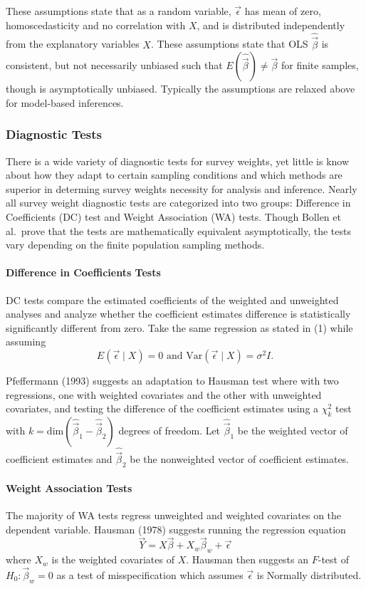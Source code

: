 \documentclass[
  letterpaper,
  DIV=11,
  numbers=noendperiod]{scrartcl}
\let\oldparagraph\paragraph
\renewcommand{\paragraph}[1]{\oldparagraph{#1}\mbox{}}
\begin{document}
These assumptions state that as a random variable, \(\vec{\epsilon}\)
has mean of zero, homoscedasticity and no correlation with \(X\), and is
distributed independently from the explanatory variables \(X\). These
assumptions state that OLS \(\hat{\vec{\beta}}\) is consistent, but not
necessarily unbiased such that \(E(\hat{\vec{\beta}}) \neq \vec{\beta}\)
for finite samples, though is asymptotically unbiased. Typically the
assumptions are relaxed above for model-based inferences.

\hypertarget{diagnostic-tests}{%
\subsubsection{Diagnostic Tests}\label{diagnostic-tests}}

There is a wide variety of diagnostic tests for survey weights, yet
little is know about how they adapt to certain sampling conditions and
which methods are superior in determing survey weights necessity for
analysis and inference. Nearly all survey weight diagnostic tests are
categorized into two groups: Difference in Coefficients (DC) test and
Weight Association (WA) tests. Though Bollen et al.~prove that the tests
are mathematically equivalent asymptotically, the tests vary depending
on the finite population sampling methods.

\hypertarget{difference-in-coefficients-tests}{%
\paragraph{Difference in Coefficients
Tests}\label{difference-in-coefficients-tests}}

DC tests compare the estimated coefficients of the weighted and
unweighted analyses and analyze whether the coefficient estimates
difference is statistically significantly different from zero. Take the
same regression as stated in (1) while assuming
\[E(\vec{\epsilon} \mid X) = 0 \text{ and } \text{Var}(\vec{\epsilon} \mid X) = \sigma^2 I.\]

Pfeffermann (1993) suggests an adaptation to Hausman test where with two
regressions, one with weighted covariates and the other with unweighted
covariates, and testing the difference of the coefficient estimates
using a \(\chi_{k}^2\) test with
\(k = \text{dim}(\hat{\vec{\beta}}_1 - \hat{\vec{\beta}}_2)\) degrees of
freedom. Let \(\hat{\vec{\beta}}_1\) be the weighted vector of
coefficient estimates and \(\hat{\vec{\beta}}_2\) be the nonweighted
vector of coefficient estimates.

\hypertarget{weight-association-tests}{%
\paragraph{Weight Association Tests}\label{weight-association-tests}}

The majority of WA tests regress unweighted and weighted covariates on
the dependent variable. Hausman (1978) suggests running the regression
equation
\[\vec{Y} = X \vec{\beta} + X_w \vec{\beta}_w + \vec{\epsilon}\] where
\(X_w\) is the weighted covariates of \(X\). Hausman then suggests an
\(F\)-test of \(H_0: \vec{\beta}_w = 0\) as a test of misspecification
which assumes \(\vec{\epsilon}\) is Normally distributed.
\end{document}
